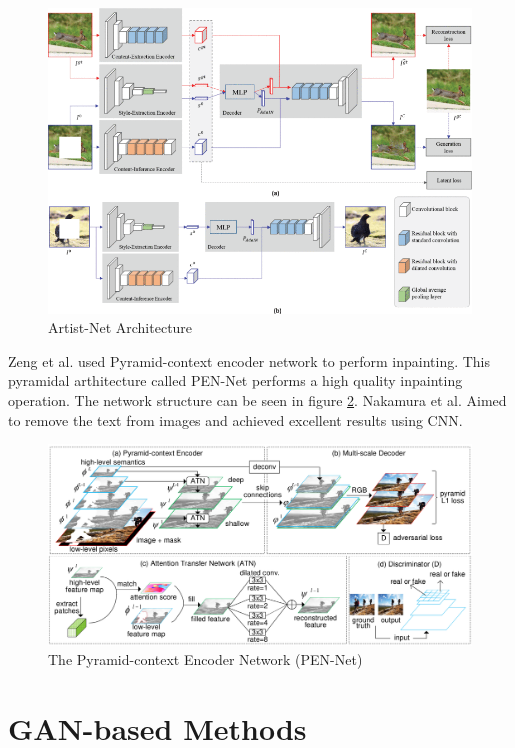 \begin{figure}[h]
    \centering
    \includegraphics[width=14cm]{figures/chapter4/artist.png}
    \caption{Artist-Net Architecture \cite{artistNet}}
    \label{fig:artistNet}
\end{figure}

Zeng et al. \cite{pyramid_network} used Pyramid-context encoder network to perform inpainting. This pyramidal arthitecture called PEN-Net performs a high quality inpainting operation. The network structure can be seen in figure \ref{fig:pennet}. Nakamura et al. \cite{nakamura} Aimed to remove the text from images and achieved excellent results using CNN.

\begin{figure}[h]
    \centering
    \includegraphics[width=14cm]{figures/chapter4/pyramid.png}
    \caption{The Pyramid-context Encoder Network (PEN-Net) \cite{pyramid_network}}
    \label{fig:pennet}
\end{figure}

\section{GAN-based Methods}

